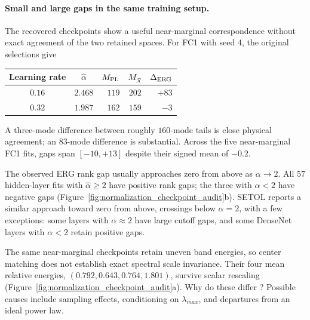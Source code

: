 \paragraph{Small and large gaps in the same training setup.}
The recovered checkpoints show a useful near-marginal correspondence
without exact agreement of the two retained spaces.
For FC1 with seed $4$, the original selections give
\begin{center}
\small
\begin{tabular}{c@{\quad}c@{\quad}r@{\quad}r@{\quad}r}
Learning rate & $\hat\alpha$ & $M_{\rm PL}$ & $M_{\mathcal R}$ & $\Delta_{\rm ERG}$\\
\hline
$0.16$ & $2.468$ & $119$ & $202$ & $+83$\\
$0.32$ & $1.987$ & $162$ & $159$ & $-3$
\end{tabular}
\end{center}
A three-mode difference between roughly $160$-mode tails is close
physical agreement; an $83$-mode difference is substantial.
Across the five near-marginal FC1 fits, gaps span $[-10,+13]$
despite their signed mean of $-0.2$.

The observed ERG rank gap usually approaches zero from above as $\alpha \rightarrow 2$.
All $57$ hidden-layer fits with $\hat\alpha\ge2$ have positive rank gaps;
the three with $\alpha < 2$ have negative gaps (Figure~\ref{fig:normalization_checkpoint_audit}b).
SETOL reports a similar approach toward zero from above, crossings below
$\alpha=2$, with a few exceptions: some layers with $\alpha\approx 2$ have large cutoff gaps,
and some DenseNet layers with $\alpha < 2$ retain positive gaps.

The same near-marginal checkpoints retain uneven band energies, so
center matching does not establish exact spectral scale invariance.
Their four mean relative energies,
$(0.792,0.643,0.764,1.801)$, survive scalar rescaling
(Figure~\ref{fig:normalization_checkpoint_audit}a).
Why do these differ ? Possible causes include sampling effects,
conditioning on $\lambda_{max}$, and departures from an ideal power law.



